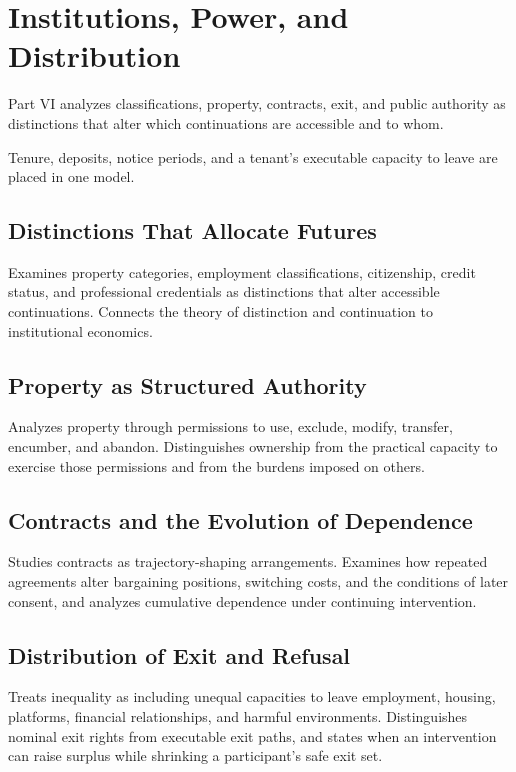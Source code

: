 \part{Institutions, Power, and Distribution}
\label{part:VI}

Part VI analyzes classifications, property, contracts, exit, and public authority as distinctions that alter which continuations are accessible and to whom.

\begin{housing}Tenure, deposits, notice periods, and a tenant's executable capacity to leave are placed in one model.\end{housing}

\chapter{Distinctions That Allocate Futures}\label{ch:26}
Examines property categories, employment classifications, citizenship, credit status, and professional credentials as distinctions that alter accessible continuations. Connects the theory of distinction and continuation to institutional economics.
\scaffold

\chapter{Property as Structured Authority}\label{ch:27}
Analyzes property through permissions to use, exclude, modify, transfer, encumber, and abandon. Distinguishes ownership from the practical capacity to exercise those permissions and from the burdens imposed on others.
\scaffold

\chapter{Contracts and the Evolution of Dependence}\label{ch:28}
Studies contracts as trajectory-shaping arrangements. Examines how repeated agreements alter bargaining positions, switching costs, and the conditions of later consent, and analyzes cumulative dependence under continuing intervention.
\scaffold

\chapter{Distribution of Exit and Refusal}\label{ch:29}
Treats inequality as including unequal capacities to leave employment, housing, platforms, financial relationships, and harmful environments. Distinguishes nominal exit rights from executable exit paths, and states when an intervention can raise surplus while shrinking a participant's safe exit set.
\scaffold

